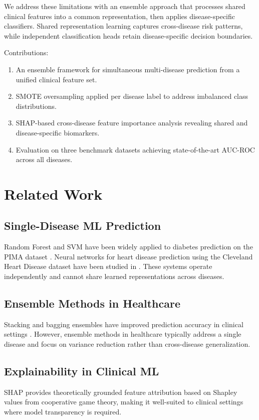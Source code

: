 \documentclass[conference]{IEEEtran}
\begin{document}
We address these limitations with an ensemble approach that processes shared clinical features into a common representation, then applies disease-specific classifiers. Shared representation learning captures cross-disease risk patterns, while independent classification heads retain disease-specific decision boundaries.

Contributions:
\begin{enumerate}
\item An ensemble framework for simultaneous multi-disease prediction from a unified clinical feature set.
\item SMOTE oversampling applied per disease label to address imbalanced class distributions.
\item SHAP-based cross-disease feature importance analysis revealing shared and disease-specific biomarkers.
\item Evaluation on three benchmark datasets achieving state-of-the-art AUC-ROC across all diseases.
\end{enumerate}

\section{Related Work}

\subsection{Single-Disease ML Prediction}
Random Forest and SVM have been widely applied to diabetes prediction on the PIMA dataset \cite{kavakiotis2017machine}. Neural networks for heart disease prediction using the Cleveland Heart Disease dataset have been studied in \cite{deng2021machine}. These systems operate independently and cannot share learned representations across diseases.

\subsection{Ensemble Methods in Healthcare}
Stacking and bagging ensembles have improved prediction accuracy in clinical settings \cite{sagi2018ensemble}. However, ensemble methods in healthcare typically address a single disease and focus on variance reduction rather than cross-disease generalization.

\subsection{Explainability in Clinical ML}
SHAP \cite{lundberg2017unified} provides theoretically grounded feature attribution based on Shapley values from cooperative game theory, making it well-suited to clinical settings where model transparency is required.
\end{document}
